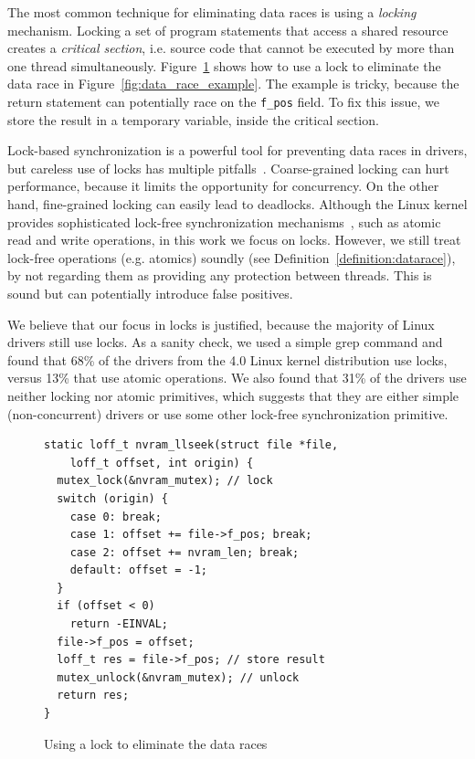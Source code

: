 The most common technique for eliminating data races is using a \emph{locking} mechanism. Locking a set of program statements that access a shared resource creates a \emph{critical section}, i.e. source code that cannot be executed by more than one thread simultaneously. Figure~\ref{fig:lock_example} shows how to use a lock to eliminate the data race in Figure~\ref{fig:data_race_example}. The example is tricky, because the return statement can potentially race on the \texttt{f\_pos} field. To fix this issue, we store the result in a temporary variable, inside the critical section.

Lock-based synchronization is a powerful tool for preventing data races in drivers, but careless use of locks has multiple pitfalls~\cite{sutter2005software}. Coarse-grained locking can hurt performance, because it limits the opportunity for concurrency. On the other hand, fine-grained locking can easily lead to deadlocks. Although the Linux kernel provides sophisticated lock-free synchronization mechanisms~\cite{corbet2005linux}, such as atomic read and write operations, in this work we focus on locks. However, we still treat lock-free operations (e.g. atomics) soundly (see Definition~\ref{definition:datarace}), by not regarding them as providing any protection between threads. This is sound but can potentially introduce false positives.

We believe that our focus in locks is justified, because the majority of Linux drivers still use locks. As a sanity check, we used a simple grep command and found that 68\% of the drivers from the 4.0 Linux kernel distribution use locks, versus 13\% that use atomic operations. We also found that 31\% of the drivers use neither locking nor atomic primitives, which suggests that they are either simple (non-concurrent) drivers or use some other lock-free synchronization primitive.

\begin{figure}[t]
\begin{lstlisting}
static loff_t nvram_llseek(struct file *file,
    loff_t offset, int origin) {
  mutex_lock(&nvram_mutex); // lock
  switch (origin) {
    case 0: break;
    case 1: offset += file->f_pos; break;
    case 2: offset += nvram_len; break;
    default: offset = -1;
  }
  if (offset < 0)
    return -EINVAL;
  file->f_pos = offset;
  loff_t res = file->f_pos; // store result
  mutex_unlock(&nvram_mutex); // unlock
  return res;
}
\end{lstlisting}
\caption{Using a lock to eliminate the data races}\label{fig:lock_example}
\end{figure}

